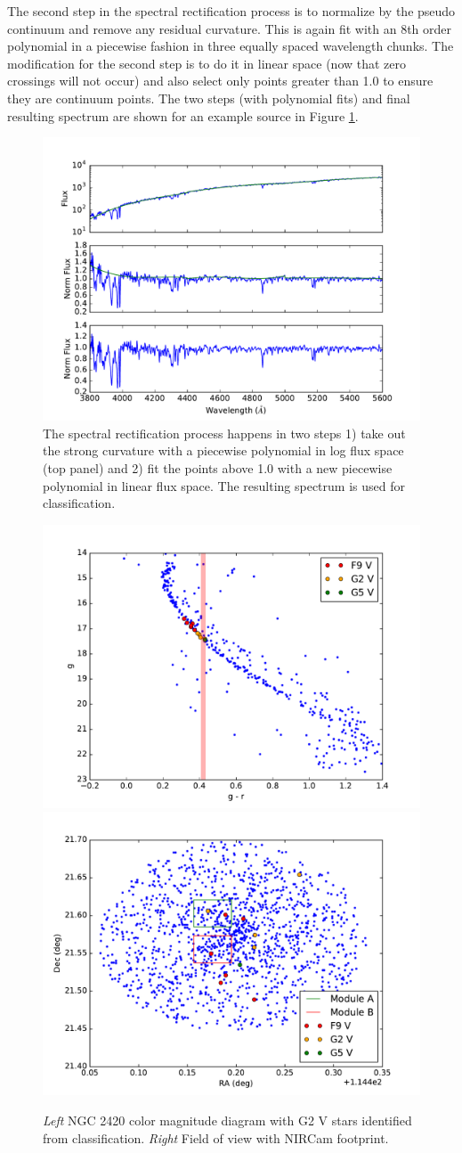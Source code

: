 \documentclass{aastex6}
\begin{document}
The second step in the spectral rectification process is to normalize by the pseudo continuum and remove any residual curvature.
This is again fit with an 8th order polynomial in a piecewise fashion in three equally spaced wavelength chunks.
The modification for the second step is to do it in linear space (now that zero crossings will not occur) and also select only points greater than 1.0 to ensure they are continuum points.
The two steps (with polynomial fits) and final resulting spectrum are shown for an example source in Figure \ref{fig:SpecRect}.

\begin{figure}[!hbtp]
\centering
\includegraphics[width=.7\columnwidth]{O_0738209_p2134_rectification.pdf}
\caption{The spectral rectification process happens in two steps 1) take out the strong curvature with a piecewise polynomial in log flux space (top panel) and 2) fit the points above 1.0 with a new piecewise polynomial in linear flux space.
The resulting spectrum is used for classification.}\label{fig:SpecRect}
\end{figure}

\begin{figure}[!hbtp]
\centering
\includegraphics[width=.49\columnwidth]{colormag.pdf}
\includegraphics[width=.49\columnwidth]{fov_ngc2420_spTypes.pdf}
\caption{{\it Left} NGC 2420 color magnitude diagram with G2 V stars identified from classification. {\it Right} Field of view with NIRCam footprint.}\label{fig:NCFOV}
\end{figure}
\end{document}
